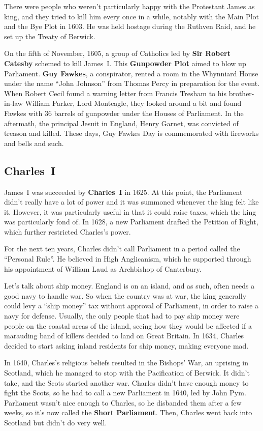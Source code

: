There were people who weren't particularly happy with the Protestant James as king,
and they tried to kill him every once in a while,
notably with the Main Plot and the Bye Plot in 1603.
He was held hostage during the Ruthven Raid, and he set up the Treaty of Berwick.

On the fifth of November, 1605,
a group of Catholics led by \textbf{Sir Robert Catesby} schemed to kill James~I.
This \textbf{Gunpowder Plot} aimed to blow up Parliament.
\textbf{Guy Fawkes}, a conspirator, rented a room in the Whynniard House
under the name ``John Johnson'' from Thomas Percy in preparation for the event.
When Robert Cecil found a warning letter from Francis Tresham
to his brother-in-law William Parker, Lord Monteagle,
they looked around a bit
and found Fawkes with 36 barrels of gunpowder under the Houses of Parliament.
In the aftermath, the principal Jesuit in England, Henry Garnet,
was convicted of treason and killed.
These days, Guy Fawkes Day is commemorated with fireworks and bells and such.

\subsection*{Charles~I}

James~I was succeeded by \textbf{Charles~I} in 1625.
At this point,
the Parliament didn't really have a lot of power and it was summoned whenever the king felt like it.
However, it was particularly useful in that it could raise taxes,
which the king was particularly fond of.
In 1628, a new Parliament drafted the Petition of Right, which further restricted Charles's power.

For the next ten years, Charles didn't call Parliament in a period called the ``Personal Rule''.
He believed in High Anglicanism,
which he supported through his appointment of William Laud as Archbishop of Canterbury.

Let's talk about ship money.
England is on an island, and as such, often needs a good navy to handle war.
So when the country was at war,
the king generally could levy a ``ship money'' tax without approval of Parliament,
in order to raise a navy for defense.
Usually, the only people that had to pay ship money were people on the coastal areas of the island,
seeing how they would be affected if a marauding band of killers decided to land on Great Britain.
In 1634, Charles decided to start asking inland residents for ship money, making everyone mad.

In 1640, Charles's religious beliefs resulted in the Bishops' War, an uprising in Scotland,
which he managed to stop with the Pacification of Berwick.
It didn't take, and the Scots started another war.
Charles didn't have enough money to fight the Scots,
so he had to call a new Parliament in 1640, led by John Pym.
Parliament wasn't nice enough to Charles, so he disbanded them after a few weeks,
so it's now called the \textbf{Short Parliament}.
Then, Charles went back into Scotland but didn't do very well.


